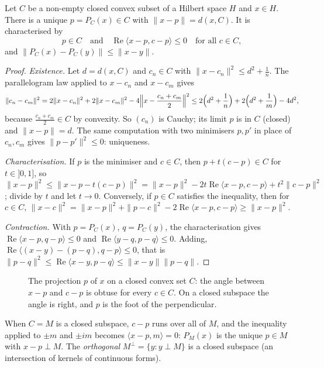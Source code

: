 \begin{theorem}\label{thm:projection}
Let $C$ be a non-empty closed convex subset of a Hilbert space $H$ and $x\in H$. There is a unique $p=P_C(x)\in C$ with $\|x-p\|=d(x,C)$. It is characterised by
\[p\in C\quad\text{and}\quad\operatorname{Re}\langle x-p,c-p\rangle\le0\quad\text{for all }c\in C,\]
and $\|P_C(x)-P_C(y)\|\le\|x-y\|$.
\end{theorem}
\begin{proof}
\emph{Existence.} Let $d=d(x,C)$ and $c_n\in C$ with $\|x-c_n\|^2\le d^2+\frac1n$. The parallelogram law applied to $x-c_n$ and $x-c_m$ gives
\[\|c_n-c_m\|^2=2\|x-c_n\|^2+2\|x-c_m\|^2-4\Bigl\|x-\frac{c_n+c_m}2\Bigr\|^2\le2\Bigl(d^2+\frac1n\Bigr)+2\Bigl(d^2+\frac1m\Bigr)-4d^2,\]
because $\frac{c_n+c_m}2\in C$ by convexity. So $(c_n)$ is Cauchy; its limit $p$ is in $C$ (closed) and $\|x-p\|=d$. The same computation with two minimisers $p,p'$ in place of $c_n,c_m$ gives $\|p-p'\|^2\le0$: uniqueness.

\emph{Characterisation.} If $p$ is the minimiser and $c\in C$, then $p+t(c-p)\in C$ for $t\in]0,1]$, so
$\|x-p\|^2\le\|x-p-t(c-p)\|^2=\|x-p\|^2-2t\operatorname{Re}\langle x-p,c-p\rangle+t^2\|c-p\|^2$; divide by $t$ and let $t\to0$. Conversely, if $p\in C$ satisfies the inequality, then for $c\in C$,
$\|x-c\|^2=\|x-p\|^2+\|p-c\|^2-2\operatorname{Re}\langle x-p,c-p\rangle\ge\|x-p\|^2$.

\emph{Contraction.} With $p=P_C(x)$, $q=P_C(y)$, the characterisation gives $\operatorname{Re}\langle x-p,q-p\rangle\le0$ and $\operatorname{Re}\langle y-q,p-q\rangle\le0$. Adding, $\operatorname{Re}\langle(x-y)-(p-q),q-p\rangle\le0$, that is
$\|p-q\|^2\le\operatorname{Re}\langle x-y,p-q\rangle\le\|x-y\|\|p-q\|$.
\end{proof}

\begin{figure}[ht]
\centering
{}
\caption{The projection $p$ of $x$ on a closed convex set $C$: the angle between $x-p$ and $c-p$ is obtuse for every $c\in C$. On a closed subspace the angle is right, and $p$ is the foot of the perpendicular.}
\label{fig:projection}
\end{figure}

When $C=M$ is a closed subspace, $c-p$ runs over all of $M$, and the inequality applied to $\pm m$ and $\pm im$ becomes $\langle x-p,m\rangle=0$: $P_M(x)$ is the unique $p\in M$ with $x-p\perp M$. The \emph{orthogonal}
$M^\perp=\{y:y\perp M\}$ is a closed subspace (an intersection of kernels of continuous forms).

